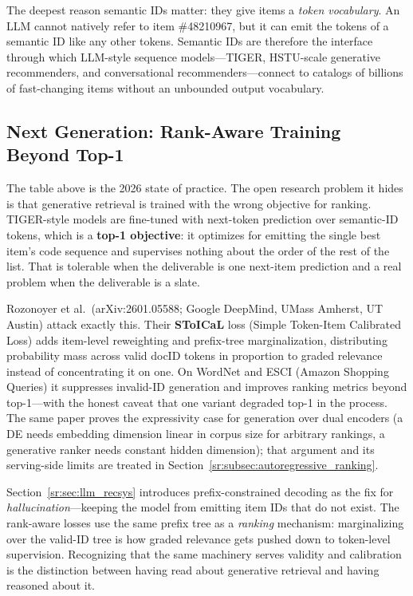 \begin{keyinsight}
The deepest reason semantic IDs matter: they give items a \textit{token vocabulary}. An LLM cannot natively refer to item \#48210967, but it can emit the tokens of a semantic ID like any other tokens. Semantic IDs are therefore the interface through which LLM-style sequence models---TIGER, HSTU-scale generative recommenders, and conversational recommenders---connect to catalogs of billions of fast-changing items without an unbounded output vocabulary.
\end{keyinsight}

\subsection{Next Generation: Rank-Aware Training Beyond Top-1}
\label{sr:subsec:rank_aware_generative}

The table above is the 2026 state of practice. The open research problem it hides is that generative retrieval is trained with the wrong objective for ranking. TIGER-style models are fine-tuned with next-token prediction over semantic-ID tokens, which is a \textbf{top-1 objective}: it optimizes for emitting the single best item's code sequence and supervises nothing about the order of the rest of the list. That is tolerable when the deliverable is one next-item prediction and a real problem when the deliverable is a slate.

Rozonoyer et al.\ (arXiv:2601.05588; Google DeepMind, UMass Amherst, UT Austin) attack exactly this. Their \textbf{SToICaL} loss (Simple Token-Item Calibrated Loss) adds item-level reweighting and prefix-tree marginalization, distributing probability mass across valid docID tokens in proportion to graded relevance instead of concentrating it on one. On WordNet and ESCI (Amazon Shopping Queries) it suppresses invalid-ID generation and improves ranking metrics beyond top-1---with the honest caveat that one variant degraded top-1 in the process. The same paper proves the expressivity case for generation over dual encoders (a DE needs embedding dimension linear in corpus size for arbitrary rankings, a generative ranker needs constant hidden dimension); that argument and its serving-side limits are treated in Section~\ref{sr:subsec:autoregressive_ranking}.

\begin{keyinsight}
Section~\ref{sr:sec:llm_recsys} introduces prefix-constrained decoding as the fix for \textit{hallucination}---keeping the model from emitting item IDs that do not exist. The rank-aware losses use the same prefix tree as a \textit{ranking} mechanism: marginalizing over the valid-ID tree is how graded relevance gets pushed down to token-level supervision. Recognizing that the same machinery serves validity and calibration is the distinction between having read about generative retrieval and having reasoned about it.
\end{keyinsight}

